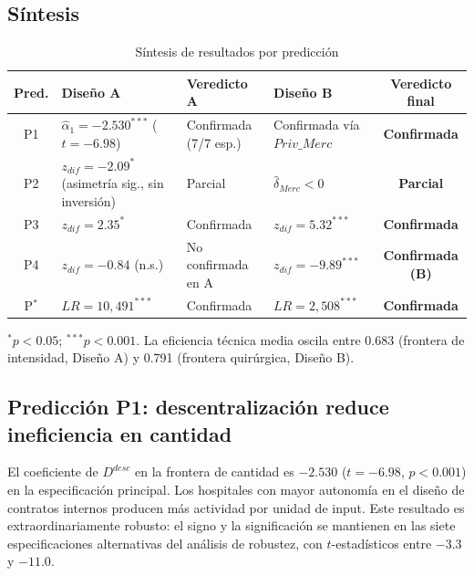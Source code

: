 \documentclass[12pt, a4paper]{article}
\begin{document}
\subsection{Síntesis}

\begin{table}[htbp]
\centering
\caption{Síntesis de resultados por predicción}
\label{tab:resultados}
\begin{threeparttable}
\small
\begin{tabular}{cp{3.2cm}p{3cm}p{2.8cm}c}
\toprule
\textbf{Pred.} & \textbf{Diseño A} & \textbf{Veredicto A}
  & \textbf{Diseño B} & \textbf{Veredicto final} \\
\midrule
P1 & $\hat{\alpha}_1=-2.530^{***}$ ($t=-6.98$)
   & Confirmada (7/7 esp.)
   & Confirmada vía $Priv\_Merc$
   & \textbf{Confirmada} \\[4pt]
P2 & $z_{dif}=-2.09^{*}$ (asimetría sig., sin inversión)
   & Parcial
   & $\hat{\delta}_{Merc}<0$
   & \textbf{Parcial} \\[4pt]
P3 & $z_{dif}=2.35^{*}$
   & Confirmada
   & $z_{dif}=5.32^{***}$
   & \textbf{Confirmada} \\[4pt]
P4 & $z_{dif}=-0.84$ (n.s.)
   & No confirmada en A
   & $z_{dif}=-9.89^{***}$
   & \textbf{Confirmada (B)} \\[4pt]
P$^*$ & $LR=10{,}491^{***}$
   & Confirmada
   & $LR=2{,}508^{***}$
   & \textbf{Confirmada} \\
\bottomrule
\end{tabular}
\begin{tablenotes}
  \small
  \item $^{*}p<0.05$; $^{***}p<0.001$. La eficiencia técnica media oscila
    entre 0.683 (frontera de intensidad, Diseño A) y 0.791 (frontera
    quirúrgica, Diseño B).
\end{tablenotes}
\end{threeparttable}
\end{table}

\subsection{Predicción P1: descentralización reduce ineficiencia en cantidad}

El coeficiente de $D^{desc}$ en la frontera de cantidad es $-2.530$ ($t=-6.98$,
$p<0.001$) en la especificación principal. Los hospitales con mayor autonomía en
el diseño de contratos internos producen más actividad por unidad de input. Este
resultado es extraordinariamente robusto: el signo y la significación se
mantienen en las siete especificaciones alternativas del análisis de robustez,
con $t$-estadísticos entre $-3.3$ y $-11.0$.
\end{document}
